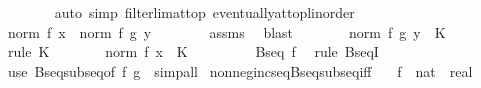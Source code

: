 \begin{isabellebody}
\ \ \ \ \ \ \isamarkupfalse%
\ {\isacharparenleft}{\kern0pt}auto\ simp{\isacharcolon}{\kern0pt}\ filterlim{\isacharunderscore}{\kern0pt}at{\isacharunderscore}{\kern0pt}top\ eventually{\isacharunderscore}{\kern0pt}at{\isacharunderscore}{\kern0pt}top{\isacharunderscore}{\kern0pt}linorder{\isacharparenright}{\kern0pt}\isanewline
\ \ \ \ \isamarkupfalse%
\ \isamarkupfalse%
\ {\isachardoublequoteopen}norm\ {\isacharparenleft}{\kern0pt}f\ x{\isacharparenright}{\kern0pt}\ {\isasymle}\ norm\ {\isacharparenleft}{\kern0pt}f\ {\isacharparenleft}{\kern0pt}g\ y{\isacharparenright}{\kern0pt}{\isacharparenright}{\kern0pt}{\isachardoublequoteclose}\isanewline
\ \ \ \ \ \ \isamarkupfalse%
\ assms{\isacharparenleft}{\kern0pt}{}{\isacharparenright}{\kern0pt}\ \isamarkupfalse%
\ blast\isanewline
\ \ \ \ \isamarkupfalse%
\ \isamarkupfalse%
\ {\isachardoublequoteopen}norm\ {\isacharparenleft}{\kern0pt}f\ {\isacharparenleft}{\kern0pt}g\ y{\isacharparenright}{\kern0pt}{\isacharparenright}{\kern0pt}\ {\isasymle}\ K{\isachardoublequoteclose}\ \isamarkupfalse%
\ {\isacharparenleft}{\kern0pt}rule\ K{\isacharparenright}{\kern0pt}\isanewline
\ \ \ \ \isamarkupfalse%
\ \isamarkupfalse%
\ {\isachardoublequoteopen}norm\ {\isacharparenleft}{\kern0pt}f\ x{\isacharparenright}{\kern0pt}\ {\isasymle}\ K{\isachardoublequoteclose}\ \isacommand{{\isachardot}{\kern0pt}}\isamarkupfalse%
\isanewline
\ \ \isacommand{{\isacharbraceright}{\kern0pt}}\isamarkupfalse%
\isanewline
\ \ \isamarkupfalse%
\ \isamarkupfalse%
\ {\isachardoublequoteopen}Bseq\ f{\isachardoublequoteclose}\ \isamarkupfalse%
\ {\isacharparenleft}{\kern0pt}rule\ BseqI{\isacharprime}{\kern0pt}{\isacharparenright}{\kern0pt}\isanewline
{}\isamarkupfalse%
\ {\isacharparenleft}{\kern0pt}use\ Bseq{\isacharunderscore}{\kern0pt}subseq{\isacharbrackleft}{\kern0pt}of\ f\ g{\isacharbrackright}{\kern0pt}\ \ simp{\isacharunderscore}{\kern0pt}all{\isacharparenright}{\kern0pt}%
\endisatagproof
{\isafoldproof}%
%
\isadelimproof
\isanewline
%
\endisadelimproof
\isanewline
{}\isamarkupfalse%
\ nonneg{\isacharunderscore}{\kern0pt}incseq{\isacharunderscore}{\kern0pt}Bseq{\isacharunderscore}{\kern0pt}subseq{\isacharunderscore}{\kern0pt}iff{\isacharcolon}{\kern0pt}\isanewline
\ \ \ f\ {\isacharcolon}{\kern0pt}{\isacharcolon}{\kern0pt}\ {\isachardoublequoteopen}nat\ {\isasymRightarrow}\ real{\isachardoublequoteclose}\isanewline

\end{isabellebody}

